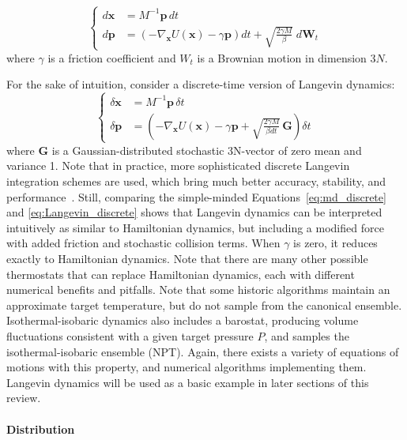 \documentclass[9pt,review]{livecoms}
\newcommand{\vx}{\mathbf{x}}
\newcommand{\vp}{\mathbf{p}}
\begin{document}
\begin{equation}
\left\{
\begin{array}{ll}
    d\vx &= M^{-1} \vp \,  dt \\
    d\vp &= \left(-\nabla_\vx U(\vx) - \gamma \vp \right) dt
    + \sqrt{ \frac{2 \gamma M}{\beta}} \; d\mathbf{W}_t
\end{array}
\right.
\end{equation}
where $\gamma$ is a friction coefficient and ${W}_t$ is a Brownian motion in dimension $3N$.

For the sake of intuition, consider a discrete-time version of Langevin dynamics:
\begin{equation}
\left\{
\begin{array}{ll}
    \delta\vx &= M^{-1} \vp \, \delta t \\
    \delta\vp &= \left(-\nabla_\vx U(\vx) - \gamma \vp + \sqrt{ \frac{2 \gamma M}{ \beta dt}} \, \mathbf{G} \right) \delta t
    \label{eq:Langevin_discrete}
\end{array}
\right.
\end{equation}
where $\mathbf{G}$ is a Gaussian-distributed stochastic 3N-vector of zero mean and variance 1.
Note that in practice, more sophisticated discrete Langevin integration schemes are used, which bring much better accuracy, stability, and performance~\cite{Skeel2002, Leimkuhler2012}.
Still, comparing the simple-minded Equations~\ref{eq:md_discrete} and \ref{eq:Langevin_discrete} shows that Langevin dynamics can be interpreted intuitively as similar to Hamiltonian dynamics, but including a modified force with added friction and stochastic collision terms. When $\gamma$ is zero, it reduces exactly to Hamiltonian dynamics.
Note that there are many other possible thermostats that can replace Hamiltonian dynamics, each with different numerical benefits and pitfalls. Note that some historic algorithms maintain an approximate target temperature, but do not sample from the canonical ensemble.
Isothermal-isobaric dynamics also includes a barostat, producing volume fluctuations consistent with a given target pressure $P$, and samples the isothermal-isobaric ensemble (NPT).
Again, there exists a variety of equations of motions with this property, and numerical algorithms implementing them. Langevin dynamics will be used as a basic example in later sections of this review.

\hypertarget{ref:Distribution}{\paragraph{Distribution}}
\end{document}
